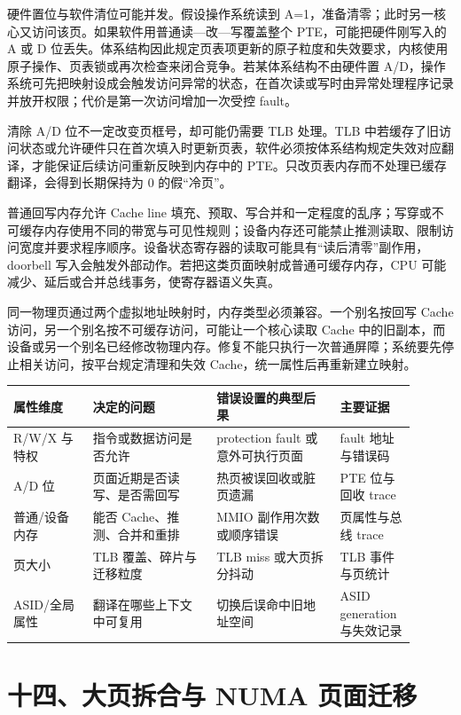 硬件置位与软件清位可能并发。假设操作系统读到 A=1，准备清零；此时另一核心又访问该页。如果软件用普通读—改—写覆盖整个 PTE，可能把硬件刚写入的 A 或 D 位丢失。体系结构因此规定页表项更新的原子粒度和失效要求，内核使用原子操作、页表锁或再次检查来闭合竞争。若某体系结构不由硬件置 A/D，操作系统可先把映射设成会触发访问异常的状态，在首次读或写时由异常处理程序记录并放开权限；代价是第一次访问增加一次受控 fault。

清除 A/D 位不一定改变页框号，却可能仍需要 TLB 处理。TLB 中若缓存了旧访问状态或允许硬件只在首次填入时更新页表，软件必须按体系结构规定失效对应翻译，才能保证后续访问重新反映到内存中的 PTE。只改页表内存而不处理已缓存翻译，会得到长期保持为 0 的假“冷页”。


普通回写内存允许 Cache line 填充、预取、写合并和一定程度的乱序；写穿或不可缓存内存使用不同的带宽与可见性规则；设备内存还可能禁止推测读取、限制访问宽度并要求程序顺序。设备状态寄存器的读取可能具有“读后清零”副作用，doorbell 写入会触发外部动作。若把这类页面映射成普通可缓存内存，CPU 可能减少、延后或合并总线事务，使寄存器语义失真。

同一物理页通过两个虚拟地址映射时，内存类型必须兼容。一个别名按回写 Cache 访问，另一个别名按不可缓存访问，可能让一个核心读取 Cache 中的旧副本，而设备或另一个别名已经修改物理内存。修复不能只执行一次普通屏障；系统要先停止相关访问，按平台规定清理和失效 Cache，统一属性后再重新建立映射。

\begin{longtable}{L{0.18\linewidth}L{0.28\linewidth}L{0.28\linewidth}L{0.16\linewidth}}
\toprule
属性维度 & 决定的问题 & 错误设置的典型后果 & 主要证据 \\
\midrule
R/W/X 与特权 & 指令或数据访问是否允许 & protection fault 或意外可执行页面 & fault 地址与错误码 \\\tablerowrule
A/D 位 & 页面近期是否读写、是否需回写 & 热页被误回收或脏页遗漏 & PTE 位与回收 trace \\\tablerowrule
普通/设备内存 & 能否 Cache、推测、合并和重排 & MMIO 副作用次数或顺序错误 & 页属性与总线 trace \\\tablerowrule
页大小 & TLB 覆盖、碎片与迁移粒度 & TLB miss 或大页拆分抖动 & TLB 事件与页统计 \\\tablerowrule
ASID/全局属性 & 翻译在哪些上下文中可复用 & 切换后误命中旧地址空间 & ASID generation 与失效记录 \\
\bottomrule
\end{longtable}

\section{十四、大页拆合与 NUMA 页面迁移}

